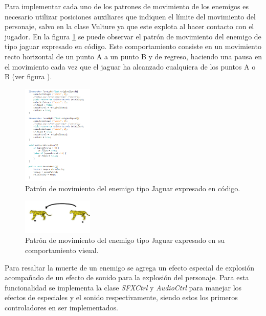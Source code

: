 Para implementar cada uno de los patrones de movimiento de los enemigos es necesario
utilizar posiciones auxiliares que indiquen el límite del movimiento del personaje,
salvo en la clase Vulture ya que este explota al hacer contacto con el jugador. En la figura \ref{fig:JaguarCode} se puede observar el patrón de movimiento del enemigo de tipo jaguar expresado en código. Este comportamiento consiste en un movimiento recto horizontal de un punto A a un punto B y de regreso, haciendo una pausa en el movimiento cada vez que el jaguar ha alcanzado cualquiera de los puntos A o B (ver figura ).
\\
\par
            \begin{figure}[h]
                \centering
                \includegraphics[width=0.3\textwidth]{03TrabajoRealizado/imagenes/PatronJaguar.png}
                \caption{Patrón de movimiento del enemigo tipo Jaguar expresado en
                código.}
                \label{fig:JaguarCode}
            \end{figure}
            
            \begin{figure}[h]
                \centering
                \includegraphics[width=0.3\textwidth]{03TrabajoRealizado/imagenes/saltoFelino.jpg}
                \caption{Patrón de movimiento del enemigo tipo Jaguar expresado en
                su comportamiento visual.}
                \label{fig:JaguarBeha}
            \end{figure}


Para resaltar la muerte de un enemigo se agrega un efecto especial de explosión
acompañado de un efecto de sonido para la explosión del personaje. Para esta
funcionalidad se implementa la clase \textit{SFXCtrl} y \textit{AudioCtrl} para 
manejar los efectos
de especiales y el sonido respectivamente, siendo estos los primeros controladores
en ser implementados.

